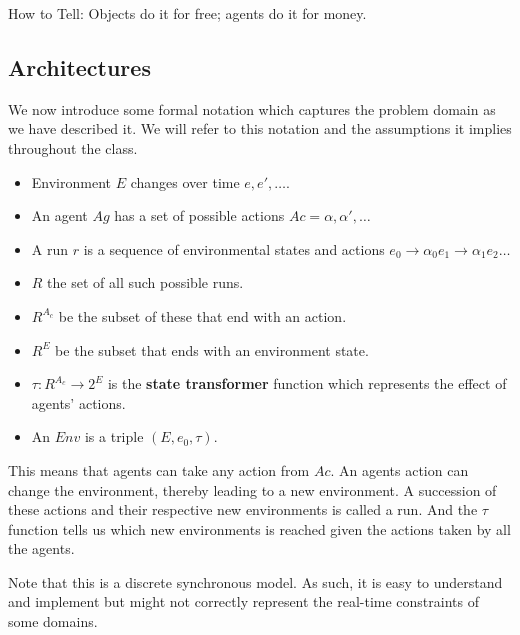   How to Tell: Objects do it for free; agents do it for money.


\subsection{Architectures}
\label{sec:architectures}

We now introduce some formal notation which captures the problem
domain as we have described it. We will refer to this notation and the
assumptions it implies throughout the class.

\begin{itemize}
  \item Environment $E$ changes over time ${e, e', \ldots}$. 
    
  \item An agent $Ag$ has a set of possible actions $Ac = {\alpha, \alpha', \ldots}$ 
    
  \item A run $r$ is a sequence of environmental states and
    actions $e_0 \rightarrow{\alpha_0} e_1 \rightarrow{\alpha_1} e_2
    \ldots$
    
  \item $R$ the set of all such possible runs. 
    
  \item $R^{A_c}$ be the subset of these
    that end with an action.
    
  \item $R^E$ be the subset that ends with an
    environment state.  
    
  \item $\tau: R^{A_c} \rightarrow 2^{E}$ is the
    \textbf{state transformer} function which represents the effect of
    agents' actions.
    
  \item An $Env$ is a triple $(E, e_0, \tau)$. 
\end{itemize}
    
This means that agents can take any action from $Ac$. An agents
action can change the environment, thereby leading to a new
environment. A succession of these actions and their respective new
environments is called a run. And the $\tau$ function tells us which
new environments is reached given the actions taken by all the agents. 

Note that this is a discrete synchronous model. As such, it is easy to
understand and implement but might not correctly represent the
real-time constraints of some domains.

